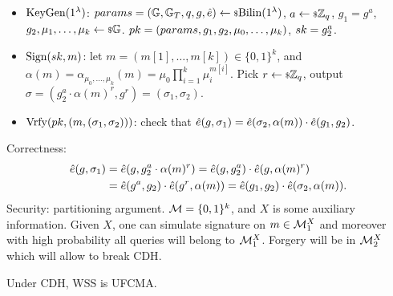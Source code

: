 \begin{construction}
	\begin{itemize}
		\item $\mathrm{KeyGen}(1^{\lambda})$: $params = \left( \mathbb{G}, \mathbb{G}_{T}, q, g, \hat{e} \right) \leftarrow {\scriptstyle \$} {\mathrm{Bilin}(1^{\lambda})}$, $a \leftarrow {\scriptstyle \$} {\mathbb{Z}_q}$, $g_1 = g^a$, $g_2, \mu_1, \dots, \mu_k \leftarrow {\scriptstyle \$} {\mathbb{G}}$.
			$pk = (params, g_1, g_2, \mu_0, \dots, \mu_k)$, $sk = g_2^a$.
		\item $\mathrm{Sign}(sk, m)$:
			let $m = (m[1], \dots, m[k]) \in \{0,1\}^{k}$,
			and $\alpha(m) = \alpha_{\mu_0, \dots, \mu_k}(m) = \mu_0 \prod_{i=1}^{k} \mu_i^{m[i]}$.
			Pick $r \leftarrow {\scriptstyle \$} {\mathbb{Z}_q}$, output $\sigma = (g_2^a \cdot \alpha(m)^r, g^r) = (\sigma_1, \sigma_2)$.
		\item $\mathrm{Vrfy}(pk, (m, (\sigma_1, \sigma_2)))$: check that $\hat{e}(g, \sigma_1) = \hat{e}(\sigma_2, \alpha(m)) \cdot \hat{e}(g_1, g_2)$.
	\end{itemize}
	Correctness:
	\begin{align*}
		\hat{e}(g, \sigma_1) & = \hat{e}(g, g_2^a \cdot \alpha(m)^r) = \hat{e}(g, g_2^a) \cdot \hat{e}(g, \alpha(m)^r) \\
		& = \hat{e}(g^a, g_2) \cdot \hat{e}(g^r, \alpha(m)) = \hat{e}(g_1, g_2) \cdot \hat{e}(\sigma_2, \alpha(m)).
	\end{align*}
	Security: partitioning argument.
	$\mathcal{M} = \{0,1\}^k$, and $X$ is some auxiliary information.
	Given $X$, one can simulate signature on $m \in \mathcal{M}_1^X$ and moreover with high probability all queries will belong to $\mathcal{M}_1^X$.
	Forgery will be in $\mathcal{M}_2^X$ which will allow to break \ac{CDH}.
\end{construction}

\begin{theorem} \label{thm:waters-ss-ufcma}
	Under \ac{CDH}, \ac{WSS} is \ac{UFCMA}.
\end{theorem}


